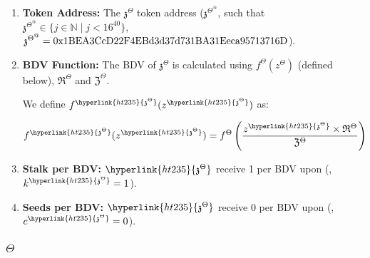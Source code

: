 \documentclass[class=article, crop=false]{standalone}
\begin{document}
\begin{enumerate}
    \item \textbf{Token Address:} The \hyperlink{ht235}{$\mathfrak{z}^{\Theta}$} token address ($\mathfrak{z}^{\Theta^@}$, such that $\mathfrak{z}^{\Theta^@} \in \{j \in \mathbb{N} \mid j < 16^{40} \}$, $\mathfrak{z}^{\Theta^@} = \\ \text{0x1BEA3CcD22F4EBd3d37d731BA31Eeca95713716D}$).
    
    \item \textbf{BDV Function:} The BDV of \hyperlink{ht235}{$\mathfrak{z}^{\Theta}$} is calculated using $f^{\Theta}(z^{\Theta})$ (defined below), $\mathfrak{R}^{\Theta}$ and $\mathfrak{Z}^{\Theta}$. 
        
        We define $f^{\hyperlink{ht235}{\mathfrak{z}^{\Theta}}}(z^{\hyperlink{ht235}{\mathfrak{z}^{\Theta}}})$ as:
        
            $$
                f^{\hyperlink{ht235}{\mathfrak{z}^{\Theta}}}(z^{\hyperlink{ht235}{\mathfrak{z}^{\Theta}}}) = 
                    f^{\Theta}\left(
                        \frac{z^{\hyperlink{ht235}{\mathfrak{z}^{\Theta}}} \times \mathfrak{R}^{\Theta}}
                            {\mathfrak{Z}^{\Theta}}\right)
            $$
                
    \item \textbf{Stalk per BDV:} $\hyperlink{ht235}{\mathfrak{z}^{\Theta}}$  receive 1  per BDV upon  (, $k^{\hyperlink{ht235}{\mathfrak{z}^{\Theta}}} = 1$).
    
    \item \textbf{Seeds per BDV:} $\hyperlink{ht235}{\mathfrak{z}^{\Theta}}$  receive 0  per BDV upon  (, $c^{\hyperlink{ht235}{\mathfrak{z}^{\Theta}}} = 0$).
\end{enumerate}

\subsubsection{$\Theta$}
\end{document}
